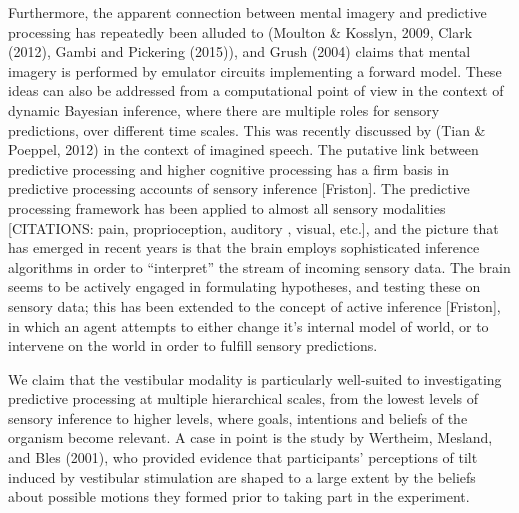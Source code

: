 \documentclass[english,floatsintext,man]{apa6}
\theoremstyle{definition}
\theoremstyle{definition}
\theoremstyle{remark}
\begin{document}
Furthermore, the apparent connection between mental imagery and
predictive processing has repeatedly been alluded to (Moulton \&
Kosslyn, 2009, Clark (2012), Gambi and Pickering (2015)), and Grush
(2004) claims that mental imagery is performed by emulator circuits
implementing a forward model. These ideas can also be addressed from a
computational point of view in the context of dynamic Bayesian
inference, where there are multiple roles for sensory predictions, over
different time scales. This was recently discussed by (Tian \& Poeppel,
2012) in the context of imagined speech. The putative link between
predictive processing and higher cognitive processing has a firm basis
in predictive processing accounts of sensory inference {[}Friston{]}.
The predictive processing framework has been applied to almost all
sensory modalities {[}CITATIONS: pain, proprioception, auditory ,
visual, etc.{]}, and the picture that has emerged in recent years is
that the brain employs sophisticated inference algorithms in order to
\enquote{interpret} the stream of incoming sensory data. The brain seems
to be actively engaged in formulating hypotheses, and testing these on
sensory data; this has been extended to the concept of active inference
{[}Friston{]}, in which an agent attempts to either change it's internal
model of world, or to intervene on the world in order to fulfill sensory
predictions.

We claim that the vestibular modality is particularly well-suited to
investigating predictive processing at multiple hierarchical scales,
from the lowest levels of sensory inference to higher levels, where
goals, intentions and beliefs of the organism become relevant. A case in
point is the study by Wertheim, Mesland, and Bles (2001), who provided
evidence that participants' perceptions of tilt induced by vestibular
stimulation are shaped to a large extent by the beliefs about possible
motions they formed prior to taking part in the experiment.
\end{document}
